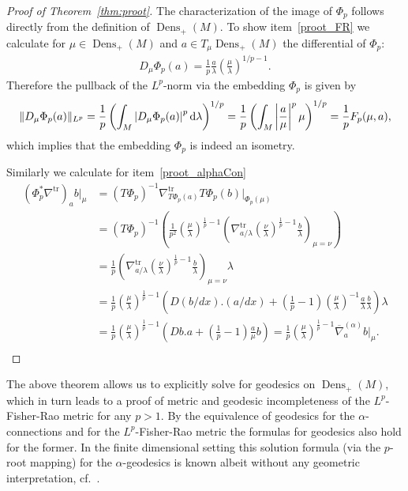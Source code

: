 \documentclass[11pt]{amsart}
\theoremstyle{definition}
\newcommand{\Abs}[1]{\left|#1\right|}
\newcommand{\dx}{\lambda}
\newcommand{\Dens}{\operatorname{Dens}_+(M)}
\newcommand{\ntr}{\nabla^{\text{tr}}}
\newcommand{\nablabar}{\overline{\nabla}}
\newcommand{\ud}{\textup{d}}
\begin{document}
\begin{proof}[Proof of Theorem~\ref{thm:proot}]
The characterization of the image of $\Phi_p$ follows directly from the definition of $\Dens$. 
To show item~\ref{proot_FR} we calculate for $\mu\in \Dens$ and $a\in T_\mu\Dens$ the differential of $\Phi_p$:
 \begin{align*}
D_\mu\Phi_p(a)=\frac1p\frac{a}{\dx}\left(\frac{\mu}{\dx}\right)^{1/p-1}.
\end{align*}
Therefore the pullback of the $L^p$-norm via the embedding $\Phi_p$ is given by 
 \begin{align*}
\| D_\mu\Phi_p(a)\|_{L^p}=\frac1p\left(\int_M\left|D_\mu\Phi_p(a)\right|^{p}\ud\dx\right)^{1/p}=\frac1p\left(\int_M\Abs{\frac{a}{\mu}}^p\mu\right)^{1/p}=\frac1pF_p(\mu,a),
\end{align*}
which implies that the embedding $\Phi_p$ is indeed an isometry.

Similarly we calculate for item~\ref{proot_alphaCon}
\[
\begin{split}
(\Phi_p^*\ntr)_a b|_\mu 
    &= (T \Phi_p)^{-1} \ntr_{T \Phi_p(a)}T \Phi_p(b)|_{\Phi_p(\mu)}\\
    &= (T \Phi_p)^{-1} \left(\frac{1}{p^2}\left(\frac{\mu}{\dx}\right)^{\frac{1}{p}-1}\left(\ntr_{a/\dx}\left(\frac{\nu}{\dx}\right)^{\frac{1}{p}-1}\frac{b}{\dx}\right)_{\mu=\nu}\right)\\
    &= \frac{1}{p}\left(\ntr_{a/\dx}\left(\frac{\nu}{\dx}\right)^{\frac{1}{p}-1}\frac{b}{\dx}\right)_{\mu=\nu}\dx\\
    &= \frac{1}{p}\left(\frac{\mu}{\dx}\right)^{\frac{1}{p}-1}\left(D(b/dx).(a/dx) + \left(\frac{1}{p}-1\right)\left(\frac{\mu}{\dx}\right)^{-1}\frac{a}{\dx}\frac{b}{\dx}\right)\dx \\
    &= \frac{1}{p}\left(\frac{\mu}{\dx}\right)^{\frac{1}{p}-1}\left(Db.a + \left(\frac{1}{p}-1\right)\frac{a}{\mu}b\right) 
    = \frac{1}{p}\left(\frac{\mu}{\dx}\right)^{\frac{1}{p}-1} \nablabar^{(\alpha)}_a b|_\mu.\\
\end{split}
\]
\end{proof}
The above theorem allows us to explicitly solve for geodesics on $\Dens$, which in turn leads to a proof of metric and geodesic incompleteness of the $L^p$-Fisher-Rao metric for any $p>1$. By the equivalence of geodesics for the $\alpha$-connections and for the $L^p$-Fisher-Rao metric the formulas for geodesics also hold for the former. In the finite dimensional setting this solution formula (via the $p$-root mapping) for the $\alpha$-geodesics is known albeit without any geometric interpretation, cf.~\cite[Page 50]{ay2017information}.
\end{document}
